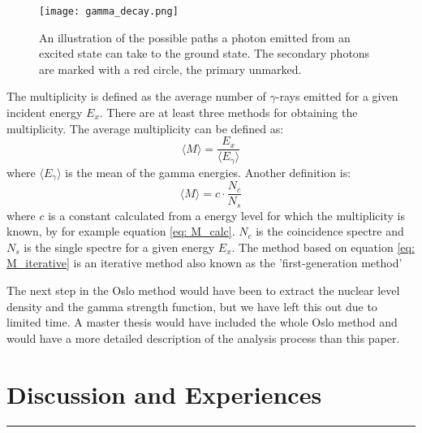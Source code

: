 \documentclass[11pt,a4wide]{article}
\begin{document}
\begin{figure}[htp]
\centering
\texttt{[image: gamma\_decay.png]}
\caption{An illustration of the possible paths a photon emitted from an excited state can take to the ground state. The secondary photons are marked with a red circle, the primary unmarked.}
\label{fig: gamma_decay}
\end{figure}

The multiplicity is defined as the average number of $\gamma$-rays emitted for a given incident energy $E_x$. There are at least three methods for obtaining the multiplicity. The average multiplicity can be defined as:
\begin{equation}
\langle M \rangle = \frac{E_x}{\langle E_\gamma \rangle}
\label{eq: M_calc}
\end{equation}
where $\langle E_\gamma \rangle$ is the mean of the gamma energies. Another definition is:
\begin{equation}
\langle M \rangle = c \cdot \frac{N_c}{N_s}
\label{eq: M_iterative}
\end{equation}
where $c$ is a constant calculated from a energy level for which the multiplicity is known, by for example equation \ref{eq: M_calc}. $N_c$ is the coincidence spectre and $N_s$ is the single spectre for a given energy $E_x$. The method based on equation \ref{eq: M_iterative} is an iterative method also known as the 'first-generation method'

The next step in the Oslo method would have been to extract the nuclear level density and the gamma strength function, but we have left this out due to limited time. A master thesis would have included the whole Oslo method and would have a more detailed description of the analysis process than this paper. 



\section{Discussion and Experiences}






\noindent\rule{\textwidth}{1pt}
\end{document}
